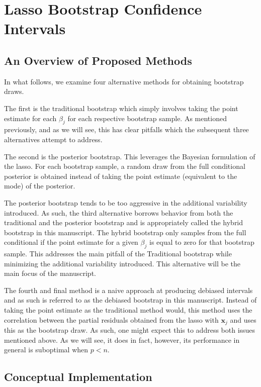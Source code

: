 \section{Lasso Bootstrap Confidence Intervals}

\subsection{An Overview of Proposed Methods}

In what follows, we examine four alternative methods for obtaining bootstrap draws.

The first is the traditional bootstrap which simply involves taking the point estimate for each $\beta_j$ for each respective bootstrap sample. As mentioned previously, and as we will see, this has clear pitfalls which the subsequent three alternatives attempt to address.

The second is the posterior bootstrap. This leverages the Bayesian formulation of the lasso. For each bootstrap sample, a random draw from the full conditional posterior is obtained instead of taking the point estimate (equivalent to the mode) of the posterior.

The posterior bootstrap tends to be too aggressive in the additional variability introduced. As such, the third alternative borrows behavior from both the traditional and the posterior bootstrap and is appropriately called the hybrid bootstrap in this manuscript. The hybrid bootstrap only samples from the full conditional if the point estimate for a given $\beta_j$ is equal to zero for that bootstrap sample. This addresses the main pitfall of the Traditional bootstrap while minimizing the additional variability introduced. This alternative will be the main focus of the manuscript.

The fourth and final method is a naive approach at producing debiased intervals and as such is referred to as the debiased bootstrap in this manuscript. Instead of taking the point estimate as the traditional method would, this method uses the correlation between the partial residuals obtained from the lasso with $\boldsymbol{x}_j$ and uses this as the bootstrap draw. As such, one might expect this to address both issues mentioned above. As we will see, it does in fact, however, its performance in general is suboptimal when $p < n$.

\subsection{Conceptual Implementation}
\label{Sec:full-cond}

